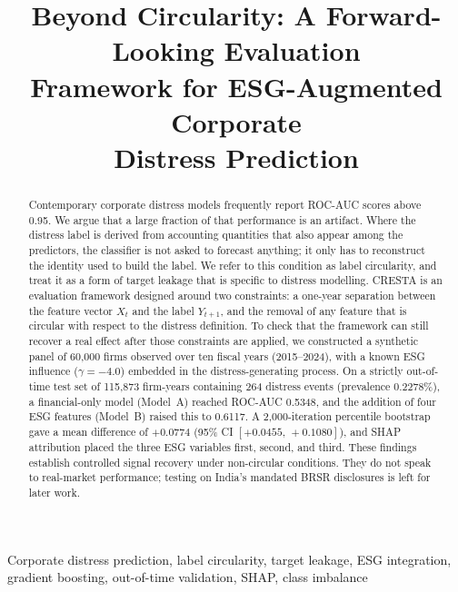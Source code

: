 \documentclass[conference]{IEEEtran}
\begin{document}
\title{Beyond Circularity: A Forward-Looking Evaluation\\
Framework for ESG-Augmented Corporate\\
Distress Prediction}

\author{
}

\maketitle

\begin{abstract}
Contemporary corporate distress models frequently report ROC-AUC scores above
0.95. We argue that a large fraction of that performance is an artifact.
Where the distress label is derived from accounting quantities that also appear
among the predictors, the classifier is not asked to forecast anything; it only
has to reconstruct the identity used to build the label. We refer to this
condition as label circularity, and treat it as a form of target leakage that is
specific to distress modelling. CRESTA is an evaluation framework designed around
two constraints: a one-year separation between the feature vector $X_t$ and the
label $Y_{t+1}$, and the removal of any feature that is circular with respect to
the distress definition. To check that the framework can still recover a real
effect after those constraints are applied, we constructed a synthetic panel of
60{,}000 firms observed over ten fiscal years (2015--2024), with a known ESG
influence ($\gamma = -4.0$) embedded in the distress-generating process. On a
strictly out-of-time test set of 115{,}873 firm-years containing 264 distress
events (prevalence 0.2278\%), a financial-only model (Model~A) reached ROC-AUC
0.5348, and the addition of four ESG features (Model~B) raised this to 0.6117. A
2{,}000-iteration percentile bootstrap gave a mean difference of $+0.0774$ (95\%
CI $[+0.0455,\, +0.1080]$), and SHAP attribution placed the three ESG variables
first, second, and third. These findings establish controlled signal recovery
under non-circular conditions. They do not speak to real-market performance;
testing on India's mandated BRSR disclosures is left for later work.
\end{abstract}

\begin{IEEEkeywords}
Corporate distress prediction, label circularity, target leakage, ESG
integration, gradient boosting, out-of-time validation, SHAP, class imbalance
\end{IEEEkeywords}
\end{document}
